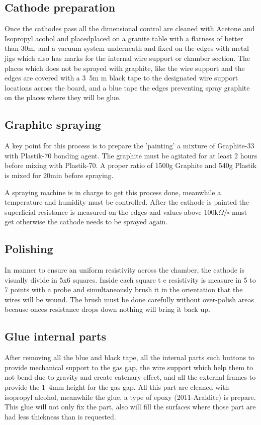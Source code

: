 \subsection{Cathode preparation}
Once the cathodes pass all the dimensional control are cleaned with Acetone and Isopropyl acohol and placedplaced on a
granite table with a flatness of better than 30\micro m, and a vacuum system underneath and fixed on the edges with
metal jigs which also has marks for the internal wire support or chamber section.  The places which does not be sprayed
with graphite, like the wire support and the edges are covered with a \unit{3.5}{m m} black tape to  the designated wire
support locations across the board, and a blue tape the edges preventing spray graphite on the places where they will be
glue. 

\subsection{Graphite spraying}
A key point for this process is to prepare the 'painting' a mixture of Graphite-33 with Plastik-70 bonding agent. The
graphite must be agitated for at least 2 hours before mixing with Plastik-70. A proper ratio of 1500g Graphite and 540g
Plastik is mixed for 20min before spraying.\par A spraying machine is in charge to get this process done, meanwhile a
temperature and humidity must be controlled. After the cathode is painted the superficial resistance is measured on the
edges and values above \unit{100}{k$\Omega/\square$} must get otherwise the cathode needs to be sprayed again.\par


\subsection{Polishing}
In manner to ensure an uniform resistivity across the chamber, the cathode is visually divide in 5x6 squares. Inside
each square t e resistivity is measure in 5 to 7 points with a probe and simultaneously brush it in the orientation that
the wires will be wound. The brush must be done carefully without over-polish areas because onces resistance drops down
nothing will bring it back up. 


\subsection{Glue internal parts}
After removing all the blue and black tape, all the internal parts such buttons to provide mechanical support to the gas
gap, the wire support which help them to not bend due to gravity and create catenary effect, and all the external frames
to provide the \unit{1.4}{mm} height for the gas gap. All this part are cleaned with isopropyl alcohol, meanwhile the
glue, a type of epoxy (2011-Araldite) is prepare. This glue will not only fix the part, also will fill the surfaces
where those part are had less thickness than is requested.


